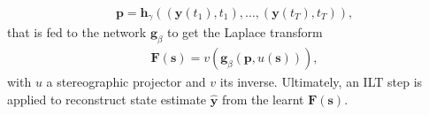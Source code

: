 \documentclass[pmlr]{jmlr}%
\begin{document}
%
\begin{equation}
\begin{aligned}
& \mathbf{p} = \mathbf{h}_{\gamma}((\mathbf{y}(t_1), t_1), \dots, (\mathbf{y}(t_T), t_T)),
\end{aligned}
\end{equation}
%
that is fed to the network $\mathbf{g}_{\beta}$ to get the Laplace transform 
%
\begin{equation}
\begin{aligned}
& \mathbf{F}(\mathbf{s}) = v\left( \mathbf{g}_{\beta}(\mathbf{p}, u(\mathbf{s})) \right),
\end{aligned}
\end{equation}
%
with $u$ a stereographic projector and $v$ its inverse. Ultimately, an ILT step is applied to reconstruct state estimate $\widehat{\mathbf{y}}$ from the learnt $\mathbf{F}(\mathbf{s})$. 
\\
\end{document}
